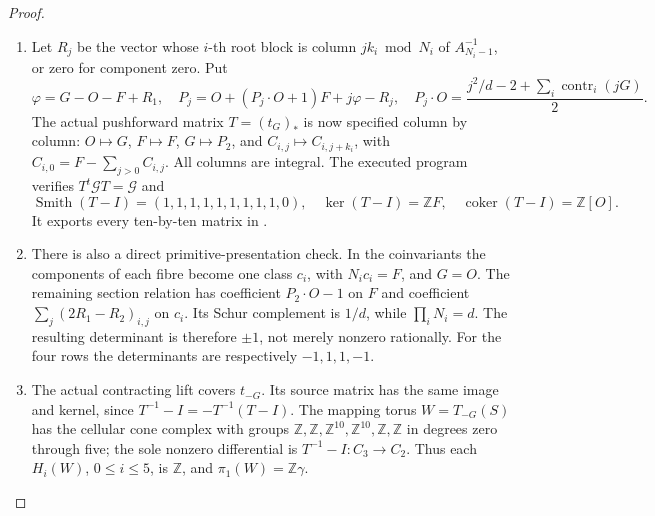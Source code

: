 \begin{proof}
\begin{enumerate}[label=\arabic*.]
\par\medskip\noindent\textbf{Every integer matrix of the source mapping torus.}\enspace
Use the divisor basis
\[
 O,F,\{C_{i,j}:1\le j<N_i\},G,
\]
where \((N_i,k_i)\) is respectively
\((8,3)\), \((7,2),(2,1)\), \((5,2),(4,1)\), or
\((5,1),(3,1),(2,1)\).  A root \(A_1\) may denote III and
a root \(A_2\) may denote IV; their displayed component intersection
and permutation matrices are unchanged.  The Gram matrix has
\(O^2=G^2=-1\), \(O\cdot F=G\cdot F=1\),
\(G\cdot C_{i,j}=\delta_{j,k_i}\), root blocks
\(-A_{N_i-1}\), and all other entries zero.  Its determinant is
minus one in every case.  Since \(H_2(S;\mathbb Z)\) is free
unimodular of rank ten, these classes are an integral basis.

\item Let \(R_j\) be the vector whose \(i\)-th root block is column
\(jk_i\bmod N_i\) of \(A_{N_i-1}^{-1}\), or zero for component
zero.  Put
\[
 \varphi=G-O-F+R_1,\quad
 P_j=O+(P_j\cdot O+1)F+j\varphi-R_j,
 \quad
 P_j\cdot O=\frac{j^2/d-2+\sum_i\operatorname{contr}_i(jG)}2.
\]
The actual pushforward matrix \(T=(t_G)_*\) is now specified
column by column: \(O\mapsto G\), \(F\mapsto F\),
\(G\mapsto P_2\), and
\(C_{i,j}\mapsto C_{i,j+k_i}\), with
\(C_{i,0}=F-\sum_{j>0}C_{i,j}\).  All columns are integral.
The executed program verifies \(T^t\mathcal G T=\mathcal G\) and
\[
 \operatorname{Smith}(T-I)=(1,1,1,1,1,1,1,1,1,0),
 \quad\ker(T-I)=\mathbb ZF,
 \quad\operatorname{coker}(T-I)=\mathbb Z[O].             \tag{P3K.22.4}
\]
It exports every ten-by-ten matrix in
.

\item There is also a direct primitive-presentation check.  In the
coinvariants the components of each fibre become one class \(c_i\),
with \(N_i c_i=F\), and \(G=O\).  The remaining section relation
has coefficient \(P_2\cdot O-1\) on \(F\) and coefficient
\(\sum_j(2R_1-R_2)_{i,j}\) on \(c_i\).  Its Schur complement is
\(1/d\), while \(\prod_iN_i=d\).  The resulting determinant is
therefore \(\pm1\), not merely nonzero rationally.  For the four
rows the determinants are respectively \(-1,1,1,-1\).

\item The actual contracting lift covers \(t_{-G}\).  Its source matrix
has the same image and kernel, since
\(T^{-1}-I=-T^{-1}(T-I)\).  The mapping torus
\(W=T_{-G}(S)\) has the cellular cone complex with groups
\(\mathbb Z,\mathbb Z,\mathbb Z^{10},\mathbb Z^{10},
\mathbb Z,\mathbb Z\) in degrees zero through five; the sole
nonzero differential is \(T^{-1}-I:C_3\to C_2\).
Thus each \(H_i(W)\), \(0\le i\le5\), is \(\mathbb Z\),
and \(\pi_1(W)=\mathbb Z\gamma\).


\end{enumerate}
\end{proof}
